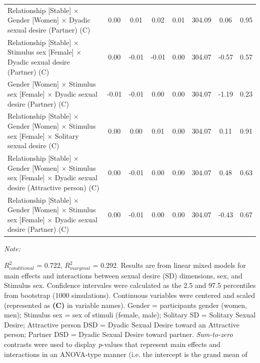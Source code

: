 \documentclass[
  bookmarksnumbered]{article}
\begin{document}
\begin{table}[H]
{\begin{threeparttable}
\begin{tabular}[t]{lccccccc}
Relationship [Stable] × Gender [Women] × Dyadic sexual desire (Partner) (C) & 0.00 & 0.01 & 0.02 & 0.01 & 304.09 & 0.06 & 0.95\\
Relationship [Stable] × Stimulus sex [Female] × Dyadic sexual desire (Partner) (C) & 0.00 & -0.01 & -0.01 & 0.00 & 304.07 & -0.57 & 0.57\\
Gender [Women] × Stimulus sex [Female] × Dyadic sexual desire (Partner) (C) & -0.01 & -0.01 & 0.00 & 0.00 & 304.07 & -1.19 & 0.23\\
Relationship [Stable] × Gender [Women] × Stimulus sex [Female] × Solitary sexual desire (C) & 0.00 & 0.00 & 0.01 & 0.00 & 304.07 & 0.11 & 0.91\\
Relationship [Stable] × Gender [Women] × Stimulus sex [Female] × Dyadic sexual desire (Attractive person) (C) & 0.00 & -0.01 & 0.00 & 0.00 & 304.07 & 0.48 & 0.63\\
Relationship [Stable] × Gender [Women] × Stimulus sex [Female] × Dyadic sexual desire (Partner) (C) & 0.00 & -0.01 & 0.00 & 0.00 & 304.07 & -0.43 & 0.67\\
\bottomrule
\end{tabular}
\begin{tablenotes}[para]
\item \textit{Note: } 
\item $R^2_{conditional}$ = 0.722, $R^2_{marginal}$ = 0.292. Results are from linear mixed models for main 
                              effects and interactions between sexual desire (SD) dimensions,
                              sex, and Stimulus sex.
                              Confidence intervales were calculated as the 2.5 and 97.5 
                              percentiles from bootstrap (1000 simulations).
                              Continuous variables were centered and scaled
                              (represented as \textbf{(C)} in variable names).
                              Gender = participants gender (women, men); 
                              Stimulus sex = sex of stimuli (female, male); 
                              Solitary SD = Solitary Sexual Desire;
                              Attractive person DSD = Dyadic Sexual Desire toward an 
                              Attractive person;
                              Partner DSD = Dyadic Sexual Desire toward partner.
                              \textit{Sum-to-zero} contrasts were used to display
                              \textit{p}-values that represent main effects and interactions 
                              in an ANOVA-type manner (i.e. the intercept is the grand mean of 

\end{tablenotes}
\end{threeparttable}}
\end{table}
\end{document}
